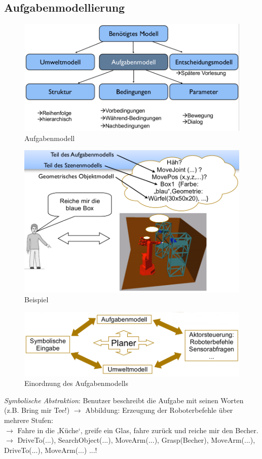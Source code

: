 \subsection{Aufgabenmodellierung}
\begin{figure}[ht]\centering 
\includegraphics[width=0.6\linewidth]{figures/ch02_aufgabenmodell.png}
\caption{Aufgabenmodell}
\label{fig:ch02_am}
\end{figure}
\begin{figure}[ht]\centering 
\includegraphics[width=0.6\linewidth]{figures/ch02_beispiel.png}
\caption{Beispiel}
\label{fig:ch02_bsp}
\end{figure}
\begin{figure}[ht]\centering 
\includegraphics[width=0.6\linewidth]{figures/ch02_planer.png}
\caption{Einordnung des Aufgabenmodells}
\label{fig:ch02_ord}
\end{figure}
\textit{Symbolische Abstraktion}: Benutzer beschreibt die Aufgabe mit seinen Worten (z.B. \glqq Bring mir Tee!\grqq) $\rightarrow$ Abbildung: Erzeugung der Roboterbefehle über mehrere Stufen:\\
$\rightarrow$ \glqq Fahre in die ‚Küche‘, greife ein Glas, fahre zurück und reiche mir den Becher.\grqq \\
$\rightarrow$ \glqq DriveTo(...), SearchObject(...), MoveArm(...), Grasp(Becher), MoveArm(...), DriveTo(...), MoveArm(...) ...!\grqq \\

